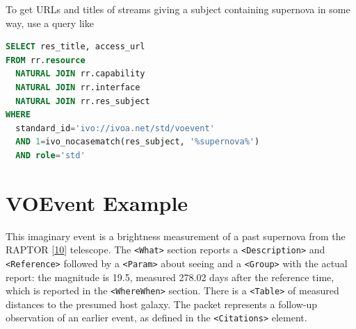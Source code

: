 \documentclass[11pt,a4paper]{ivoa}
\begin{document}
To get URLs and titles of streams giving a subject containing supernova
in some way, use a query like

\begin{lstlisting}[language=SQL]
SELECT res_title, access_url
FROM rr.resource
  NATURAL JOIN rr.capability
  NATURAL JOIN rr.interface
  NATURAL JOIN rr.res_subject
WHERE 
  standard_id='ivo://ivoa.net/std/voevent'
  AND 1=ivo_nocasematch(res_subject, '%supernova%')
  AND role='std'
\end{lstlisting}

\section{VOEvent Example}
\label{sec:4}
This imaginary event is a brightness measurement of a past supernova from the RAPTOR [\hyperref[bib10]{10}] telescope. The {\tt <What>} section reports a {\tt <Description>} and {\tt <Reference>} followed by a {\tt <Param>} about seeing and a {\tt <Group>} with the actual report: the magnitude is 19.5, measured 278.02 days after the reference time, which is reported in the {\tt <WhereWhen>} section. There is a {\tt <Table>} of measured distances to the presumed host galaxy. The packet represents a follow-up observation of an earlier event, as defined in the {\tt <Citations>} element. 
\end{document}
